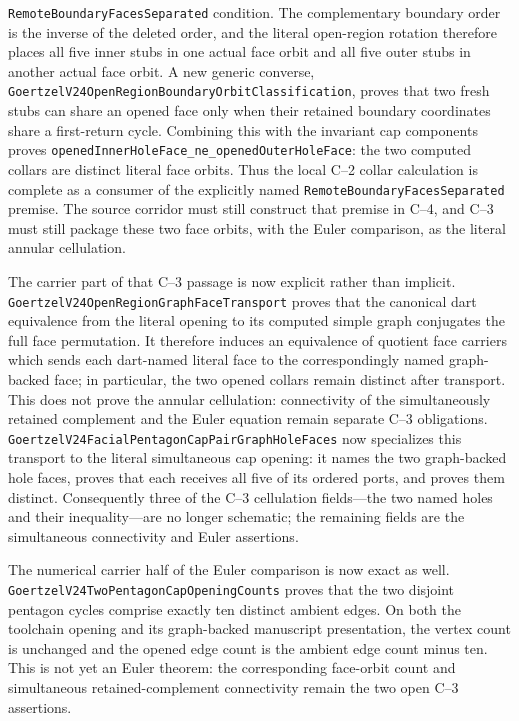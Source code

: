 \documentclass[11pt]{article}
\theoremstyle{definition}
\begin{document}
\texttt{RemoteBoundaryFacesSeparated} condition.  The complementary boundary
order is the inverse of the deleted order, and the literal open-region
rotation therefore places all five inner stubs in one actual face orbit and
all five outer stubs in another actual face orbit.  A new generic converse,
\texttt{GoertzelV24OpenRegionBoundaryOrbitClassification}, proves that two
fresh stubs can share an opened face only when their retained boundary
coordinates share a first-return cycle.  Combining this with the invariant
cap components proves
\texttt{openedInnerHoleFace\_ne\_openedOuterHoleFace}: the two computed collars
are distinct literal face orbits.  Thus the local C--2 collar calculation is
complete as a consumer of the explicitly named
\texttt{RemoteBoundaryFacesSeparated} premise.  The source corridor must still
construct that premise in C--4, and C--3 must still package these two face
orbits, with the Euler comparison, as the literal annular cellulation.

The carrier part of that C--3 passage is now explicit rather than implicit.
\texttt{GoertzelV24OpenRegionGraphFaceTransport} proves that the canonical
dart equivalence from the literal opening to its computed simple graph
conjugates the full face permutation.  It therefore induces an equivalence of
quotient face carriers which sends each dart-named literal face to the
correspondingly named graph-backed face; in particular, the two opened collars
remain distinct after transport.  This does not prove the annular cellulation:
connectivity of the simultaneously retained complement and the Euler equation
remain separate C--3 obligations.
\texttt{GoertzelV24FacialPentagonCapPairGraphHoleFaces} now specializes
this transport to the literal simultaneous cap opening: it names the two
graph-backed hole faces, proves that each receives all five of its ordered
ports, and proves them distinct.  Consequently three of the C--3 cellulation
fields---the two named holes and their inequality---are no longer schematic;
the remaining fields are the simultaneous connectivity and Euler assertions.

The numerical carrier half of the Euler comparison is now exact as well.
\texttt{GoertzelV24TwoPentagonCapOpeningCounts} proves that the two disjoint
pentagon cycles comprise exactly ten distinct ambient edges.  On both the
toolchain opening and its graph-backed manuscript presentation, the vertex
count is unchanged and the opened edge count is the ambient edge count minus
ten.  This is not yet an Euler theorem: the corresponding face-orbit count and
simultaneous retained-complement connectivity remain the two open C--3
assertions.
\end{document}

